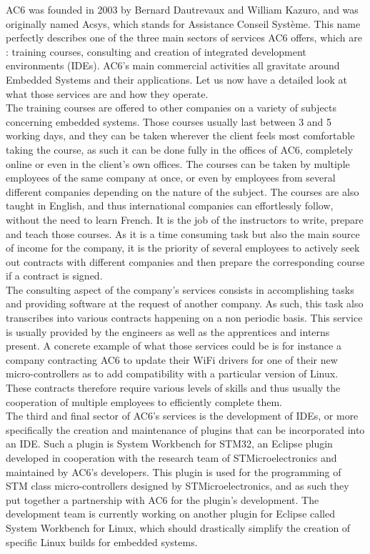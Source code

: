 \documentclass[12pt]{article}
\begin{document}
AC6 was founded in 2003 by Bernard Dautrevaux and William Kazuro, and was originally named Acsys, which stands for Assistance Conseil Système. This name perfectly describes one of the three main sectors of services AC6 offers, which are : training courses, consulting and creation of integrated development environments (IDEs). AC6's main commercial activities all gravitate around Embedded Systems and their applications. Let us now have a detailed look at what those services are and how they operate. \\
The training courses are offered to other companies on a variety of subjects concerning embedded systems. Those courses usually last between 3 and 5 working days, and they can be taken wherever the client feels most comfortable taking the course, as such it can be done fully in the offices of AC6, completely online or even in the client's own offices. The courses can be taken by multiple employees of the same company at once, or even by employees from several different companies depending on the nature of the subject. The courses are also taught in English, and thus international companies can effortlessly follow, without the need to learn French. It is the job of the instructors to write, prepare and teach those courses. As it is a time consuming task but also the main source of income for the company, it is the priority of several employees to actively seek out contracts with different companies and then prepare the corresponding course if a contract is signed. \\
The consulting aspect of the company's services consists in accomplishing tasks and providing software at the request of another company. As such, this task also transcribes into various contracts happening on a non periodic basis. This service is usually provided by the engineers as well as the apprentices and interns present. A concrete example of what those services could be is for instance a company contracting AC6 to update their WiFi drivers for one of their new micro-controllers as to add compatibility with a particular version of Linux. These contracts therefore require various levels of skills and thus usually the cooperation of multiple employees to efficiently complete them. \\
The third and final sector of AC6's services is the development of IDEs, or more specifically the creation and maintenance of plugins that can be incorporated into an IDE. Such a plugin is System Workbench for STM32, an Eclipse plugin developed in cooperation with the research team of STMicroelectronics and maintained by AC6's developers. This plugin is used for the programming of STM class micro-controllers designed by STMicroelectronics, and as such they put together a partnership with AC6 for the plugin's development. The development team is currently working on another plugin for Eclipse called System Workbench for Linux, which should drastically simplify the creation of specific Linux builds for embedded systems. \\
\end{document}
